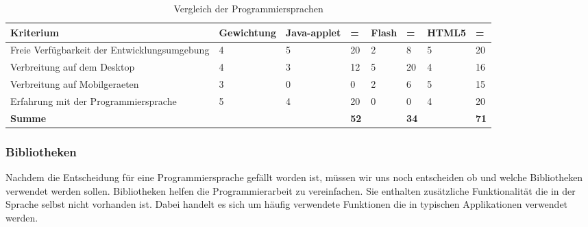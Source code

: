 \documentclass[11pt,paper=a4,final]{scrartcl}
\begin{document}
\begin{table}[h!]
  \centering
  \begin{tabular}{|p{5cm}|l|l|l|l|l|l|l|} \hline
    \bf Kriterium & \bf Gewichtung & \bf Java-applet & \bf = & \bf Flash &
    \bf = & \bf HTML5 & \bf = \\ \hline
    Freie Verf\"ugbarkeit der Entwicklungsumgebung
    					  & 4 & 5 & 20 & 2 & 8  & 5 & 20 \\ \hline
    Verbreitung auf dem Desktop           & 4 & 3\cite{heise:bsi-java}
    \cite{heise:moz-app-java} & 12 & 5 & 20 & 4 & 16 \\ \hline
    Verbreitung auf Mobilgeraeten         & 3 & 0 & 0  & 2 & 6  & 5 & 15 \\ \hline
    Erfahrung mit der Programmiersprache  & 5 & 4 & 20 & 0 & 0  & 4 & 20 \\ \hline
    \bf Summe 				  &   &   & \cellcolor{red!80!} \bf 52 &   &
    \cellcolor{red!80!}\bf  34 &   & \cellcolor{green!80!}\bf 71 \\
    \hline
  \end{tabular}
  \caption{Vergleich der Programmiersprachen}
  \label{tab:langs}
\end{table}
\subsubsection{Bibliotheken}
Nachdem die Entscheidung f\"ur eine Programmiersprache gef\"allt worden ist,
m\"ussen wir uns noch entscheiden ob und welche Bibliotheken verwendet werden
sollen. Bibliotheken helfen die Programmierarbeit zu vereinfachen. Sie enthalten
zus\"atzliche Funktionalit\"at die in der Sprache selbst nicht vorhanden ist.
Dabei handelt es sich um h\"aufig verwendete Funktionen die in typischen
Applikationen verwendet werden.
\end{document}
